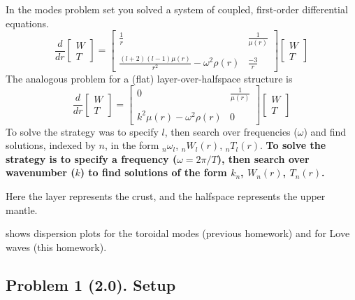 \documentclass[11pt,titlepage,fleqn]{article}
\begin{document}
In the modes problem set you solved a system of coupled, first-order differential equations.
%
\begin{equation}
\frac{d}{dr}
\left[ \begin{array}{c} W \\ T \end{array} \right]
=
\left[ \begin{array}{cc}
\frac{1}{r} & \frac{1}{\mu(r)} \\
& \\
\frac{(l+2)(l-1)\mu(r)}{r^2} -\omega^2\rho(r)  & \frac{-3}{r}
\end{array} \right]
\left[ \begin{array}{c} W \\ T \end{array} \right]
\label{ODEs}
\end{equation}
%
The analogous problem for a (flat) layer-over-halfspace structure is
%
\begin{equation}
\frac{d}{dr}
\left[ \begin{array}{c} W \\ T \end{array} \right]
=
\left[ \begin{array}{cc}
0 & \frac{1}{\mu(r)} \\
& \\
k^2 \mu(r)-\omega^2\rho(r) & 0
\end{array} \right]
\left[ \begin{array}{c} W \\ T \end{array} \right]
\label{rODEs}
\end{equation}
%
To solve  the strategy was to specify $l$, then search over frequencies ($\omega$) and find solutions, indexed by $n$, in the form $_n\omega_l$, $_nW_l(r)$, $_nT_l(r)$. {\bf To solve  the strategy is to specify a frequency ($\omega = 2\pi/T$), then search over wavenumber ($k$) to find solutions of the form $k_n$, $W_n(r)$, $T_n(r)$.}

Here the layer represents the crust, and the halfspace represents the upper mantle.

 shows dispersion plots for the toroidal modes (previous homework) and for Love waves (this homework).


\subsection*{Problem 1 (2.0). Setup}
\end{document}
